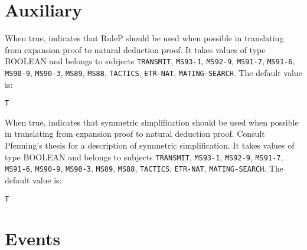 \section{Auxiliary}

\begin{description} 
\item[USE-RULEP]  
When true, indicates that RuleP should be used when possible
in translating from expansion proof to natural deduction proof.
It takes values of type BOOLEAN and belongs to subjects \texttt{TRANSMIT}, \texttt{MS93-1}, \texttt{MS92-9}, \texttt{MS91-7}, \texttt{MS91-6}, \texttt{MS90-9}, \texttt{MS90-3}, \texttt{MS89}, \texttt{MS88}, \texttt{TACTICS}, \texttt{ETR-NAT}, \texttt{MATING-SEARCH}.  The default value is: \begin{lstlisting}
T
\end{lstlisting}

\item[USE-SYMSIMP]  
When true, indicates that symmetric simplification should be 
used when possible in translating from expansion proof to natural deduction 
proof.  Consult Pfenning's thesis for a description of symmetric
simplification.
It takes values of type BOOLEAN and belongs to subjects \texttt{TRANSMIT}, \texttt{MS93-1}, \texttt{MS92-9}, \texttt{MS91-7}, \texttt{MS91-6}, \texttt{MS90-9}, \texttt{MS90-3}, \texttt{MS89}, \texttt{MS88}, \texttt{TACTICS}, \texttt{ETR-NAT}, \texttt{MATING-SEARCH}.  The default value is: \begin{lstlisting}
T
\end{lstlisting}

\item
\end{description}

\section{Events}

